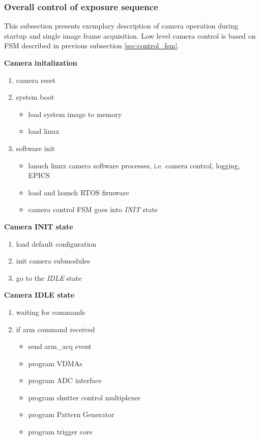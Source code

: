 \subsubsection{Overall control of exposure sequence}
This subsection presents exemplary description of camera operation during startup and single image frame acquisition. Low level camera control is based on FSM described in previous subsection \ref{sec:control_fsm}.

\begin{description}

\item \textbf{Camera initalization}
\begin{enumerate}
\item camera reset
\item system boot
	\begin{itemize}
		\item load system image to memory
		\item load linux
	\end{itemize}
\item software init
	\begin{itemize}
		\item lanuch linux camera software processes, i.e. camera control, logging, EPICS
		\item load and launch RTOS firmware
		\item camera control FSM goes into \emph{INIT} state
	\end{itemize}
\end{enumerate}

\item \textbf{Camera INIT state}
\begin{enumerate}
	\item load default configuration
	\item init camera submodules
	\item go to the \emph{IDLE} state
\end{enumerate}

\item \textbf{Camera IDLE state}
\begin{enumerate}
\item waiting for commands
\item if arm command received
\begin{itemize}
\item send arm\_acq event
\item program VDMAs
\item program ADC interface
\item program shutter control multiplexer
\item program Pattern Generator
\item program trigger core
\end{itemize}


\end{enumerate}
\end{description}
